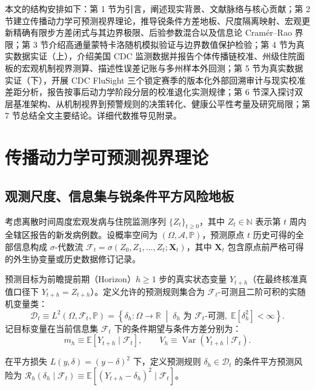 \documentclass[10pt,a4paper]{article}
\theoremstyle{plain}
\theoremstyle{definition}
\begin{document}
本文的结构安排如下：第 1 节为引言，阐述现实背景、文献脉络与核心贡献；第 2 节建立传播动力学可预测视界理论，推导锐条件方差地板、尺度隔离映射、宏观更新精确有限步方差闭式与其边界极限、后验参数混合以及信息论 Cramér--Rao 界限；第 3 节介绍高通量蒙特卡洛随机模拟验证与边界数值保护检验；第 4 节为真实数据实证（上），介绍美国 CDC 监测数据并报告个体传播链校准、州级住院面板的宏观机制视界测算、描述性误差记账与多州样本外回测；第 5 节为真实数据实证（下），开展 CDC FluSight 三个锁定赛季的版本化外部回溯审计与现实校准差距分析，报告按事后动力学阶段分层的校准退化实测规律；第 6 节深入探讨双层基准架构、从机制视界到预警规则的决策转化、健康公平性考量及研究局限；第 7 节总结全文主要结论。详细代数推导见附录。

\section{传播动力学可预测视界理论}

\subsection{观测尺度、信息集与锐条件平方风险地板}\label{sec:risk_floor}

考虑离散时间周度宏观发病与住院监测序列 $\{Z_t\}_{t \ge 0}$，其中 $Z_t \in \mathbb{N}$ 表示第 $t$ 周内全辖区报告的新发病例数。设概率空间为 $(\Omega, \mathcal{A}, \mathbb{P})$，预测原点 $t$ 历史可得的全部信息构成 $\sigma$-代数流 $\mathcal{F}_t = \sigma(Z_0, Z_1, \dots, Z_t; \mathbf{X}_t)$，其中 $\mathbf{X}_t$ 包含原点前严格可得的外生协变量或历史数据修订记录。

预测目标为前瞻提前期（Horizon）$h \ge 1$ 步的真实状态变量 $Y_{t+h}$（在最终核准真值口径下 $Y_{t+h} = Z_{t+h}$）。定义允许的预测规则集合为 $\mathcal{F}_t$-可测且二阶可积的实随机变量类：
\begin{equation}
\mathcal{D}_t \equiv L^2(\Omega, \mathcal{F}_t, \mathbb{P}) = \left\{ \delta_h : \Omega \to \mathbb{R} \;\middle|\; \delta_h \text{ 为 } \mathcal{F}_t\text{-可测}, \; \mathbb{E}[\delta_h^2] < \infty \right\}.
\end{equation}
记目标变量在当前信息集 $\mathcal{F}_t$ 下的条件期望与条件方差分别为：
\begin{equation}
m_h \equiv \mathbb{E}[Y_{t+h} \mid \mathcal{F}_t], \qquad V_h \equiv \operatorname{Var}(Y_{t+h} \mid \mathcal{F}_t).
\end{equation}

在平方损失 $L(y, \delta) = (y - \delta)^2$ 下，定义预测规则 $\delta_h \in \mathcal{D}_t$ 的条件平方预测风险为 $\mathcal{R}_h(\delta_h \mid \mathcal{F}_t) \equiv \mathbb{E}[(Y_{t+h} - \delta_h)^2 \mid \mathcal{F}_t]$。
\end{document}
